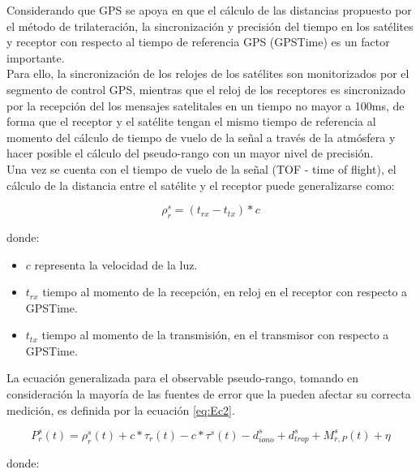 Considerando que GPS se apoya en que el cálculo de las distancias propuesto por el método de trilateración, la sincronización y precisión del tiempo en los satélites y receptor con respecto al tiempo de referencia GPS (GPSTime) es un factor importante.\\

Para ello, la sincronización de los relojes de los satélites son monitorizados por el segmento de control GPS, mientras que el reloj de los receptores es sincronizado por la recepción del los mensajes satelitales en un tiempo no mayor a 100ms, de forma que el receptor y el satélite tengan el mismo tiempo de referencia al momento del cálculo de tiempo de vuelo de la señal a través de la atmósfera y hacer posible el cálculo del pseudo-rango con un mayor nivel de precisión.\\

Una vez se cuenta con el tiempo de vuelo de la señal (TOF - time of flight), el cálculo de la %
distancia entre el satélite y el receptor puede generalizarse como:

\begin{equation}
\rho_{r}^{s} = (t_{rx} - t_{tx}) * c
\label{eq:Ec1}
\end{equation}

\noindent donde:

\begin{itemize}[label=]
	\item $c$ representa la velocidad de la luz.
	\item $t_{rx}$ tiempo al momento de la recepción, en reloj en el receptor con respecto a GPSTime.
	\item $t_{tx}$ tiempo al momento de la transmisión, en el transmisor con respecto a GPSTime.
\end{itemize}

La ecuación generalizada para el observable pseudo-rango, tomando en consideración la mayoría de las fuentes de error que la pueden afectar su correcta medición, es definida por la ecuación \ref{eq:Ec2}.

\begin{equation}
P_{r}^{s}(t) = \rho_{r}^{s}(t) +c*\tau_{r}(t) -c*\tau^{s}(t) -d_{iono}^{s} + d_{trop}^{s} + M_{r, P}^{s}(t) + \eta
\label{eq:Ec2}
\end{equation}

\noindent donde:


